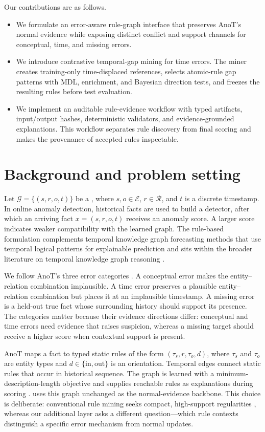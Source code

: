 Our contributions are as follows.
\begin{itemize}[leftmargin=*,itemsep=2pt,topsep=2pt]
  \item We formulate an error-aware rule-graph interface that preserves AnoT's normal evidence while exposing distinct conflict and support channels for conceptual, time, and missing errors.
  \item We introduce contrastive temporal-gap mining for time errors. The miner creates training-only time-displaced references, selects atomic-rule gap patterns with MDL, enrichment, and Bayesian direction tests, and freezes the resulting rules before test evaluation.
  \item We implement an auditable rule-evidence workflow with typed artifacts, input/output hashes, deterministic validators, and evidence-grounded explanations. This workflow separates rule discovery from final scoring and makes the provenance of accepted rules inspectable.
\end{itemize}

\section{Background and problem setting}

Let $\mathcal{G}=\{(s,r,o,t)\}$ be a \tkg, where $s,o\in\mathcal{E}$, $r\in\mathcal{R}$, and $t$ is a discrete timestamp. In online anomaly detection, historical facts are used to build a detector, after which an arriving fact $x=(s,r,o,t)$ receives an anomaly score. A larger score indicates weaker compatibility with the learned graph. The rule-based formulation complements temporal knowledge graph forecasting methods that use temporal logical patterns for explainable prediction \cite{Liu_2022} and sits within the broader literature on temporal knowledge graph reasoning \cite{Cai_2023}.

We follow AnoT's three error categories \cite{Zhang_2024}. A conceptual error makes the entity--relation combination implausible. A time error preserves a plausible entity--relation combination but places it at an implausible timestamp. A missing error is a held-out true fact whose surrounding history should support its presence. The categories matter because their evidence directions differ: conceptual and time errors need evidence that raises suspicion, whereas a missing target should receive a higher score when contextual support is present.

AnoT maps a fact to typed static rules of the form $(\tau_s,r,\tau_o,d)$, where $\tau_s$ and $\tau_o$ are entity types and $d\in\{\mathrm{in},\mathrm{out}\}$ is an orientation. Temporal edges connect static rules that occur in historical sequence. The graph is learned with a minimum-description-length objective and supplies reachable rules as explanations during scoring \cite{Zhang_2024}. \method uses this graph unchanged as the normal-evidence backbone. This choice is deliberate: conventional rule mining seeks compact, high-support regularities \cite{Galarraga_2015}, whereas our additional layer asks a different question---which rule contexts distinguish a specific error mechanism from normal updates.

